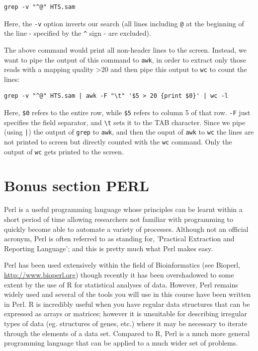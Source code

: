 \documentclass[11pt]{article}
\begin{document}
\begin{verbatim}
grep -v "^@" HTS.sam
\end{verbatim}

Here, the \texttt{-v} option inverts our search (all lines including \texttt{@} at
the beginning of the line - specified by the \texttt{\textasciicircum{}} sign - are excluded).

The above command would print all non-header lines to the
screen. Instead, we want to pipe the output of this command to \texttt{awk},
in order to extract only those reads with a mapping quality >20 and
then pipe this output to \texttt{wc} to count the lines:

\begin{verbatim}
grep -v "^@" HTS.sam | awk -F "\t" '$5 > 20 {print $0}' | wc -l
\end{verbatim}

Here, \texttt{\$0} refers to the entire row, while \texttt{\$5} refers to column 5 of
that row. \texttt{-F} just specifies the field separator, and
\texttt{\textbackslash{}t} sets it to the TAB character. Since we pipe (using \texttt{|}) the output of \texttt{grep} to
\texttt{awk}, and then the ouput of \texttt{awk} to \texttt{wc} the lines are not printed to screen but directly
counted with the \texttt{wc} command. Only the output of \texttt{wc} gets printed to the screen.
\section{Bonus section PERL}
\label{sec:orgheadline34}
Perl is a useful programming language whose principles can be learnt
within a short period of time allowing researchers not familiar with
programming to quickly become able to automate a variety of processes.
Although not an official acronym, Perl is often referred to as standing
for, 'Practical Extraction and Reporting Language'; and this is pretty much
what Perl makes easy.

Perl has been used extensively within the field of Bioinformatics (see
Bioperl, \url{http://www.bioperl.org}) though recently it has been overshadowed to
some extent by the use of R for statistical analyses of data. However,
Perl remains widely used and several of the tools you will use in this
course have been written in Perl. R is incredibly useful when you have
regular data structures that can be expressed as arrays or matrices;
however it is unsuitable for describing irregular types of data (eg.
structures of genes, etc.) where it may be necessary to iterate through
the elements of a data set. Compared to R, Perl is a much more general
programming language that can be applied to a much wider set of
problems.
\end{document}
